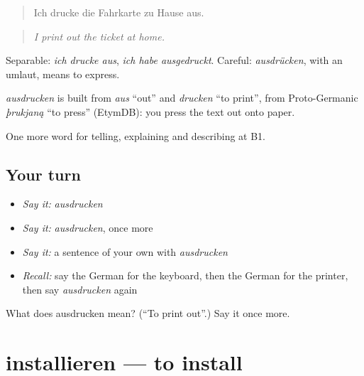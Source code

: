 \begin{quote}
Ich drucke die Fahrkarte zu Hause aus.
\end{quote}

\begin{quote}
\emph{I print out the ticket at home.}
\end{quote}

Separable: \emph{ich drucke aus}, \emph{ich habe ausgedruckt}. Careful: \emph{ausdrücken}, with an umlaut, means to express.

\begin{cousinweb}
\emph{ausdrucken} is built from \emph{aus} \textquotedblleft{}out\textquotedblright{} and \emph{drucken} \textquotedblleft{}to print\textquotedblright{}, from Proto-Germanic \emph{þrukjaną} \textquotedblleft{}to press\textquotedblright{} (EtymDB): you press the text out onto paper.
\end{cousinweb}

\begin{grammarlens}[title={What you've built}]
One more word for telling, explaining and describing at B1.
\end{grammarlens}

\subsection*{Your turn}
\begin{itemize}
\raggedright
  \item \emph{Say it:} \emph{ausdrucken}
  \item \emph{Say it:} \emph{ausdrucken}, once more
  \item \emph{Say it:} a sentence of your own with \emph{ausdrucken}
  \item \emph{Recall:} say the German for the keyboard, then the German for the printer, then say \emph{ausdrucken} again
\end{itemize}

\begin{tcolorbox}[breakable,colback=teal!4,colframe=teal!35!black,title={Before you move on}]
What does ausdrucken mean? (\textquotedblleft{}To print out\textquotedblright{}.) Say it once more.
\end{tcolorbox}
\section[installieren]{installieren — to install}

\label{lesson:GE-C396-installieren}



